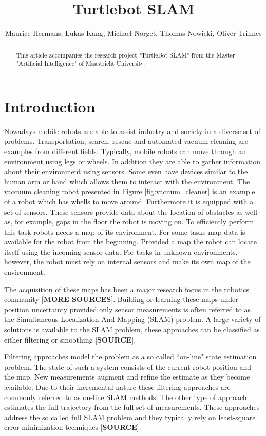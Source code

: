 \documentclass{ba-kecs}
\title{Turtlebot SLAM }
\author{Maurice Hermans, Lukas Kang, Michael Norget, Thomas Nowicki, Oliver Trinnes}
\begin{document}
\maketitle

\begin{abstract}
This article accompanies the research project "TurtleBot SLAM" from the Master "Artificial Intelligence" of Maastricht University.
\end{abstract}

\section{Introduction}
\label{sec:intro}
Nowadays mobile robots are able to assist industry and society in a diverse set of problems. Transportation, search, rescue and automated vacuum cleaning are examples from different fields. Typically, mobile robots can move through an environment using legs or wheels. In addition they are able to gather information about their environment using sensors. Some even have devices similar to the human arm or hand which allows them to interact with the environment. The vaccuum cleaning robot presented in Figure \ref{fig:vacuum_cleaner} is an example of a robot which has whells to move around. Furthermore it is equipped with a set of sensors. These sensors provide data about the location of obstacles as well as, for example, gaps in the floor the robot is moving on. To efficiently perform this task robots needs a map of its environment. For some tasks map data is available for the robot from the beginning. Provided a map the robot can locate itself using the incoming sensor data. For tasks in unknown environments, however, the robot must rely on internal sensors and make its own map of the environment.

The acquisition of these maps has been a major research focus in the robotics community \cite{Grisetti} [\textbf{MORE SOURCES}]. Building or learning these maps under position uncertainty provided only sensor measurements is often referred to as the Simultaneous Localization And Mapping (SLAM) problem. A large variety of solutions is available to the SLAM problem, these approaches can be classified as either filtering or smoothing [\textbf{SOURCE}].

Filtering approaches model the problem as a so called ``on-line" state estimation problem. The state of such a system consists of the current robot position and the map. New measurements augment and refine the estimate as they become available. Due to their incremental nature these filtering approaches are commonly referred to as on-line SLAM methods. The other type of approach estimates the full trajectory from the full set of measurements. These approaches address the so called full SLAM problem and they typically rely on least-square error minimization techniques [\textbf{SOURCE}].
\end{document}
